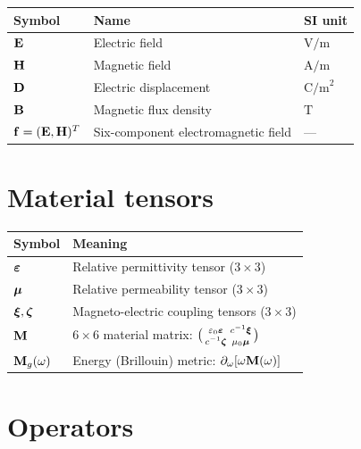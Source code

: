 \begin{center}
\begin{tabular}{lll}
  \toprule
  \textbf{Symbol} & \textbf{Name} & \textbf{SI unit} \\
  \midrule
  $\mathbf{E}$ & Electric field & $\mathrm{V/m}$ \\
  $\mathbf{H}$ & Magnetic field & $\mathrm{A/m}$ \\
  $\mathbf{D}$ & Electric displacement & $\mathrm{C/m}^2$ \\
  $\mathbf{B}$ & Magnetic flux density & $\mathrm{T}$ \\
  $\mathbf{f}=(\mathbf{E},\mathbf{H})^T$ &
    Six-component electromagnetic field & --- \\
  \bottomrule
\end{tabular}
\end{center}

\section*{Material tensors}

\begin{center}
\begin{tabular}{ll}
  \toprule
  \textbf{Symbol} & \textbf{Meaning} \\
  \midrule
  $\boldsymbol{\varepsilon}$ & Relative permittivity tensor ($3\times 3$) \\
  $\boldsymbol{\mu}$ & Relative permeability tensor ($3\times 3$) \\
  $\boldsymbol{\xi},\boldsymbol{\zeta}$ & Magneto-electric coupling tensors ($3\times 3$) \\
  $\mathbf{M}$ & $6\times 6$ material matrix:
    $\bigl(\begin{smallmatrix}\varepsilon_0\boldsymbol{\varepsilon} & c^{-1}\boldsymbol{\xi}\\
    c^{-1}\boldsymbol{\zeta}&\mu_0\boldsymbol{\mu}\end{smallmatrix}\bigr)$ \\
  $\mathbf{M}_g(\omega)$ & Energy (Brillouin) metric:
    $\partial_\omega[\omega\mathbf{M}(\omega)]$ \\
  \bottomrule
\end{tabular}
\end{center}

\section*{Operators}

